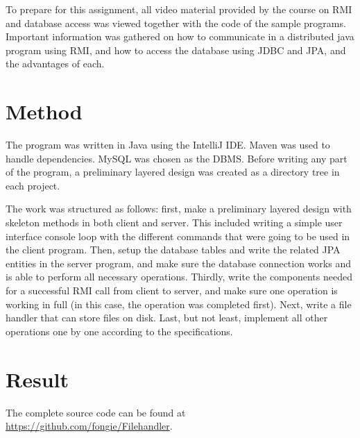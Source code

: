 \documentclass[a4paper]{scrartcl}
\begin{document}
To prepare for this assignment, all video material provided by the course on RMI and database access was viewed together with the code of the sample programs. Important information was gathered on how to communicate in a distributed java program using RMI, and how to access the database using JDBC and JPA, and the advantages of each.

\section{Method}

\noindent The program was written in Java using the IntelliJ IDE. Maven was used to handle dependencies. MySQL was chosen as the DBMS. Before writing any part of the program, a preliminary layered design was created as a directory tree in each project.

The work was structured as follows: first, make a preliminary layered design with skeleton methods in both client and server. This included writing a simple user interface console loop with the different commands that were going to be used in the client program. Then, setup the database tables and write the related JPA entities in the server program, and make sure the database connection works and is able to perform all necessary operations. Thirdly, write the components needed for a successful RMI call from client to server, and make sure one operation is working in full (in this case, the  operation was completed first). Next, write a file handler that can store files on disk. Last, but not least, implement all other operations one by one according to the specifications.

\section{Result}

\noindent The complete source code can be found at \href{https://github.com/fongie/Filehandler}{https://github.com/fongie/Filehandler}.
\end{document}
